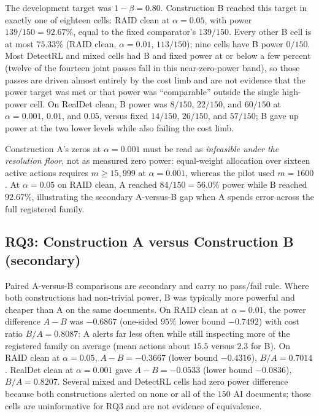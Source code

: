 \documentclass[pdflatex,sn-mathphys-num]{sn-jnl}
\begin{document}
The development target was \(1-\beta=0.80\). Construction B reached this target in exactly one of eighteen cells: RAID clean at \(\alpha=0.05\), with power \(139/150=92.67\%\), equal to the fixed comparator's \(139/150\). Every other B cell is at most \(75.33\%\) (RAID clean, \(\alpha=0.01\), \(113/150\)); nine cells have B power \(0/150\). Most DetectRL and mixed cells had B and fixed power at or below a few percent (twelve of the fourteen joint passes fall in this near-zero-power band), so those passes are driven almost entirely by the cost limb and are not evidence that the power target was met or that power was ``comparable'' outside the single high-power cell. On RealDet clean, B power was \(8/150\), \(22/150\), and \(60/150\) at \(\alpha=0.001\), \(0.01\), and \(0.05\), versus fixed \(14/150\), \(26/150\), and \(57/150\); B gave up power at the two lower levels while also failing the cost limb.

Construction A's zeros at \(\alpha=0.001\) must be read as \emph{infeasible under the resolution floor}, not as measured zero power: equal-weight allocation over sixteen active actions requires \(m\ge 15{,}999\) at \(\alpha=0.001\), whereas the pilot used \(m=1600\). At \(\alpha=0.05\) on RAID clean, A reached \(84/150=56.0\%\) power while B reached \(92.67\%\), illustrating the secondary A-versus-B gap when A spends error across the full registered family.

\subsection{RQ3: Construction A versus Construction B (secondary)}

Paired A-versus-B comparisons are secondary and carry no pass/fail rule. Where both constructions had non-trivial power, B was typically more powerful and cheaper than A on the same documents. On RAID clean at \(\alpha=0.01\), the power difference \(A-B\) was \(-0.6867\) (one-sided \(95\%\) lower bound \(-0.7492\)) with cost ratio \(B/A=0.8087\): A alerts far less often while still inspecting more of the registered family on average (mean actions about \(15.5\) versus \(2.3\) for B). On RAID clean at \(\alpha=0.05\), \(A-B=-0.3667\) (lower bound \(-0.4316\)), \(B/A=0.7014\). RealDet clean at \(\alpha=0.001\) gave \(A-B=-0.0533\) (lower bound \(-0.0836\)), \(B/A=0.8207\). Several mixed and DetectRL cells had zero power difference because both constructions alerted on none or all of the \(150\) AI documents; those cells are uninformative for RQ3 and are not evidence of equivalence.
\end{document}
